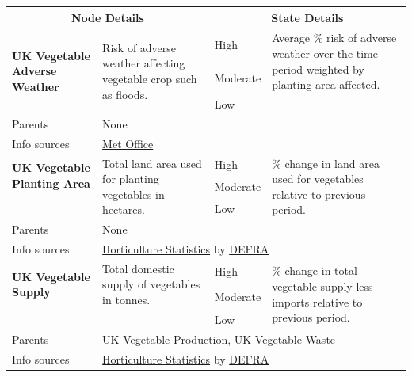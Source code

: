 \documentclass[12pt,notitlepage]{article}
\begin{document}
\begin{tabularx}{\textwidth}{
p{}p{}p{}p{}}  
\toprule
\multicolumn{2}{c}{\textbf{Node Details}}	& \multicolumn{2}{c}{\textbf{State Details}}\\
\midrule
\multirow{3}{0.175\textwidth}{\textbf{UK Vegetable Adverse Weather}}	
& \multirow{3}{0.275\textwidth}{Risk of adverse weather affecting vegetable crop such as floods.}
  & High 		& \multirow{2}{0.375\textwidth}{Average \% risk of adverse weather over the time period weighted by planting area affected.}\\
& & Moderate 	&\\
& & Low 		&\\
Parents & \multicolumn{3}{p{0.75\textwidth}}{None}\\
Info sources & \multicolumn{3}{p{0.75\textwidth}}{\href{http://www.metoffice.gov.uk/}{Met Office}}\\
\midrule
\multirow{2}{0.175\textwidth}{\textbf{UK Vegetable Planting Area}}	
& \multirow{3}{0.275\textwidth}{Total land area used for planting vegetables in hectares.}
  & High 		& \multirow{3}{0.375\textwidth}{\% change in land area used for vegetables relative to previous period.}\\
& & Moderate 	&\\
& & Low 		&\\
Parents & \multicolumn{3}{p{0.75\textwidth}}{None}\\
Info sources & \multicolumn{3}{p{0.75\textwidth}}{\href{https://www.gov.uk/government/collections/horticultural-statistics}{Horticulture Statistics} by \href{https://www.gov.uk/government/organisations/department-for-environment-food-rural-affairs}{DEFRA}}\\
\midrule
\multirow{2}{0.175\textwidth}{\textbf{UK Vegetable Supply}}	
& \multirow{2}{0.275\textwidth}{Total domestic supply of vegetables in tonnes.}
  & High 		& \multirow{3}{0.375\textwidth}{\% change in total vegetable supply less imports relative to previous period.}\\
& & Moderate 	&\\
& & Low 		&\\
Parents & \multicolumn{3}{p{0.75\textwidth}}{UK Vegetable Production, UK Vegetable Waste}\\
Info sources & \multicolumn{3}{p{0.75\textwidth}}{\href{https://www.gov.uk/government/collections/horticultural-statistics}{Horticulture Statistics} by \href{https://www.gov.uk/government/organisations/department-for-environment-food-rural-affairs}{DEFRA}}\\

\end{tabularx}
\end{document}
